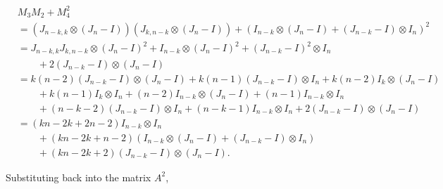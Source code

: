 \begin{align*}
    &M_3M_2 + M_4^2\\
    &= (J_{n-k,k}\otimes (J_n-I))(J_{k,n-k}\otimes (J_n-I)) + (I_{n-k} \otimes (J_n-I) + (J_{n-k}-I)\otimes I_n)^2\\
    &= J_{n-k,k}J_{k,n-k}\otimes (J_n-I)^2 + I_{n-k} \otimes (J_n-I)^2 + (J_{n-k}-I)^2\otimes I_n \\
    &\quad\quad + 2(J_{n-k}-I)\otimes(J_n-I)\\
    &= k(n-2)(J_{n-k}-I)\otimes(J_n-I) +  k(n-1)(J_{n-k}-I)\otimes I_n + k(n-2)I_k\otimes (J_n-I)\\
    &\quad\quad +k(n-1)I_k\otimes I_n + (n-2)I_{n-k}\otimes(J_n-I) + (n-1)I_{n-k}\otimes I_n\\
    &\quad\quad+ (n-k-2)(J_{n-k}-I)\otimes I_n + (n-k-1)I_{n-k}\otimes I_n + 2(J_{n-k}-I)\otimes(J_n-I)\\
    &= (kn-2k+2n-2)I_{n-k}\otimes I_n\\
    &\quad\quad+(kn-2k+n-2)(I_{n-k}\otimes(J_n-I)+(J_{n-k}-I)\otimes I_n)\\
    &\quad\quad+(kn-2k+2)(J_{n-k}-I)\otimes(J_n-I).
\end{align*}

Substituting back into the matrix $A^2$, 


